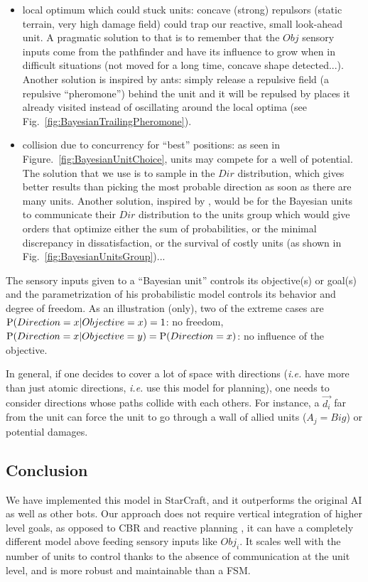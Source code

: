 \begin{itemize}
    \item local optimum which could stuck units: concave (strong) repulsors (static terrain, very high damage field) could trap our reactive, small look-ahead unit. A pragmatic solution to that is to remember that the $Obj$ sensory inputs come from the pathfinder and have its influence to grow when in difficult situations (not moved for a long time, concave shape detected...). Another solution is inspired by ants: simply release a repulsive field (a repulsive ``pheromone'') behind the unit and it will be repulsed by places it already visited instead of oscillating around the local optima (see Fig.~\ref{fig:BayesianTrailingPheromone}).
    \item collision due to concurrency for ``best'' positions: as seen in Figure.~\ref{fig:BayesianUnitChoice}, units may compete for a well of potential. The solution that we use is to sample in the $Dir$ distribution, which gives better results than picking the most probable direction as soon as there are many units. Another solution, inspired by \citep{Marthi05concurrenthierarchical}, would be for the Bayesian units to communicate their $Dir$ distribution to the units group which would give orders that optimize either the sum of probabilities, or the minimal discrepancy in dissatisfaction, or the survival of costly units (as shown in Fig.~\ref{fig:BayesianUnitsGroup})...
\end{itemize}



The sensory inputs given to a ``Bayesian unit'' controls its objective(s) or goal(s) and the parametrization of his probabilistic model controls its behavior and degree of freedom. As an illustration (only), two of the extreme cases are $\mathrm{P}(Direction=x|Objective=x)=1$: no freedom, $\mathrm{P}(Direction=x|Objective=y)=\mathrm{P}(Direction=x)$: no influence of the objective. %

In general, if one decides to cover a lot of space with directions (\textit{i.e.} have more than just atomic directions, \textit{i.e.} use this model for planning), one needs to consider directions whose paths collide with each others. For instance, a $\vec{d_i}$ far from the unit can force the unit to go through a wall of allied units ($A_j = Big$) or potential damages. %

\subsection{Conclusion}
We have implemented this model in StarCraft, and it outperforms the original AI as well as other bots. Our approach does not require vertical integration of higher level goals, as opposed to CBR and reactive planning \citep{Ontanon2007,WeberCIG10}, it can have a completely different model above feeding sensory inputs like $Obj_i$. It scales well with the number of units to control thanks to the absence of communication at the unit level, and is more robust and maintainable than a FSM.
